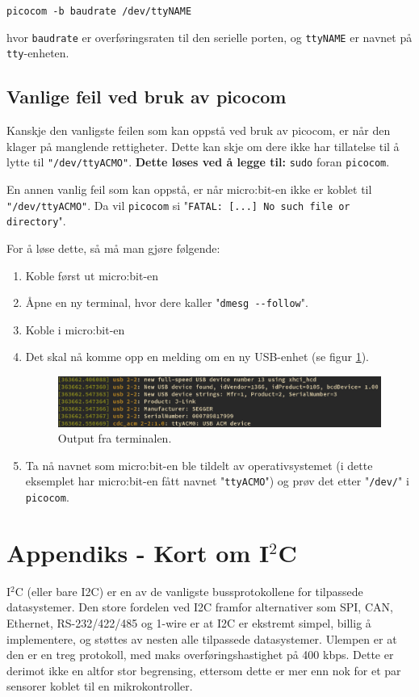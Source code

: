 \verb|picocom -b baudrate /dev/ttyNAME|

hvor \verb|baudrate| er overføringsraten til den serielle porten, og \verb|ttyNAME| er navnet på \verb|tty|-enheten.

\subsection{Vanlige feil ved bruk av picocom}
Kanskje den vanligste feilen som kan oppstå ved bruk av picocom, er når den klager på manglende rettigheter. Dette kan skje om dere ikke har tillatelse til å lytte til \verb|"/dev/ttyACMO"|. \textbf{Dette løses ved å legge til:} \verb|sudo| foran \verb|picocom|.

En annen vanlig feil som kan oppstå, er når micro:bit-en ikke er koblet til \verb|"/dev/ttyACMO"|. Da vil \verb|picocom| si "\verb|FATAL: [...] No such file or directory|".

For å løse dette, så må man gjøre følgende:
\begin{enumerate}
    \item Koble først ut micro:bit-en
    \item Åpne en ny terminal, hvor dere kaller "\verb|dmesg --follow|".
    \item Koble i micro:bit-en
    \item Det skal nå komme opp en melding om en ny USB-enhet (se figur \ref{fig:picocom-terminal-output}).
    \begin{figure}[ht]
        \centering
       \includegraphics[scale=0.4]{Main/figures/picocom.JPG}
        \caption{Output fra terminalen.}
        \label{fig:picocom-terminal-output}
    \end{figure}
    
    \item Ta nå navnet som micro:bit-en ble tildelt av operativsystemet (i dette eksemplet har micro:bit-en fått navnet "\verb|ttyACMO|") og prøv det etter "\verb|/dev/|" i \verb|picocom|.
    
\end{enumerate}

\cprotect\section{Appendiks - Kort om I$^2$C}\label{app:TWI}
I$^2$C (eller bare I2C) er en av de vanligste bussprotokollene for tilpassede datasystemer. Den store fordelen ved I2C framfor alternativer som SPI, CAN, Ethernet, RS-232/422/485 og 1-wire er at I2C er ekstremt simpel, billig å implementere, og støttes av nesten alle tilpassede datasystemer. Ulempen er at den er en treg protokoll, med maks overføringshastighet på 400 kbps. Dette er derimot ikke en altfor stor begrensing, ettersom dette er mer enn nok for et par sensorer koblet til en mikrokontroller.

